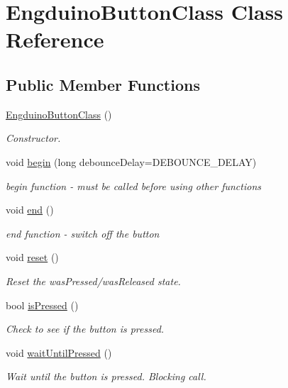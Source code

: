 \hypertarget{class_engduino_button_class}{}\section{Engduino\+Button\+Class Class Reference}
\label{class_engduino_button_class}
\subsection*{Public Member Functions}
\begin{DoxyCompactItemize}
\item 
\hyperlink{group___engduino_button_ga63fbf8689adcf68e546153e1cba62277}{Engduino\+Button\+Class} ()
\begin{DoxyCompactList}\small\item\em Constructor. \end{DoxyCompactList}\item 
void \hyperlink{group___engduino_button_ga22235e73e3a5e2e4b0a8c12709b53ea5}{begin} (long debounce\+Delay=D\+E\+B\+O\+U\+N\+C\+E\+\_\+\+D\+E\+L\+A\+Y)
\begin{DoxyCompactList}\small\item\em begin function -\/ must be called before using other functions \end{DoxyCompactList}\item 
void \hyperlink{group___engduino_button_gabd1ddb88707b93a8ebd1ad61c458073e}{end} ()
\begin{DoxyCompactList}\small\item\em end function -\/ switch off the button \end{DoxyCompactList}\item 
void \hyperlink{group___engduino_button_ga7725cc88999b6287c4b2e3ba0d2f4cac}{reset} ()
\begin{DoxyCompactList}\small\item\em Reset the was\+Pressed/was\+Released state. \end{DoxyCompactList}\item 
bool \hyperlink{group___engduino_button_ga7b1d7a4d6a9602d549ad7d22fbe1d61b}{is\+Pressed} ()
\begin{DoxyCompactList}\small\item\em Check to see if the button is pressed. \end{DoxyCompactList}\item 
void \hyperlink{group___engduino_button_gab7c5e25ca8c7b46bb5afb89349dc2764}{wait\+Until\+Pressed} ()
\begin{DoxyCompactList}\small\item\em Wait until the button is pressed. Blocking call. \end{DoxyCompactList}\item 

\end{DoxyCompactItemize}
